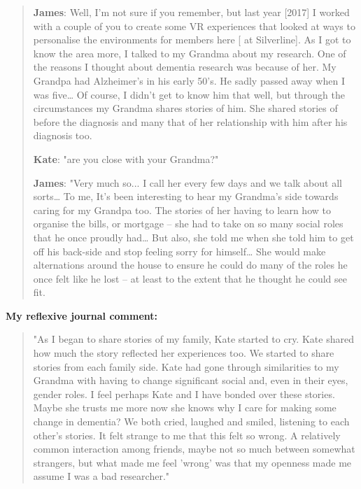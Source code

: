 \begin{quote}
    
\textbf{James}: Well, I'm not sure if you remember, but last year [2017] I worked with a couple of you to create some VR experiences that looked at ways to personalise the environments for members here [ at Silverline]. As I got to know the area more, I talked to my Grandma about my research. One of the reasons I thought about dementia research was because of her. My Grandpa had Alzheimer's in his early 50's. He sadly passed away when I was five… Of course, I didn't get to know him that well, but through the circumstances my Grandma shares stories of him. She shared stories of before the diagnosis and many that of her relationship with him after his diagnosis too.

\textbf{Kate}: "are you close with your Grandma?"

\textbf{James}: "Very much so... I call her every few days and we talk about all sorts… To me, It's been interesting to hear my Grandma's side towards caring for my Grandpa too. The stories of her having to learn how to organise the bills, or mortgage – she had to take on so many social roles that he once proudly had… But also, she told me when she told him to get off his back-side and stop feeling sorry for himself… She would make alternations around the house to ensure he could do many of the roles he once felt like he lost – at least to the extent that he thought he could see fit. 
\end{quote}

\textbf{My reflexive journal comment: 
}
\begin{quote}
"As I began to share stories of my family, Kate started to cry. Kate shared how much the story reflected her experiences too. We started to share stories from each family side. Kate had gone through similarities to my Grandma with having to change significant social and, even in their eyes, gender roles. I feel perhaps Kate and I have bonded over these stories. Maybe she trusts me more now she knows why I care for making some change in dementia? We both cried, laughed and smiled, listening to each other's stories. It felt strange to me that this felt so wrong. A relatively common interaction among friends, maybe not so much between somewhat strangers, but what made me feel 'wrong' was that my openness made me assume I was a bad researcher."
\end{quote}

